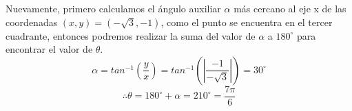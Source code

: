 \vspace{4mm}
Nuevamente, primero calculamos el ángulo auxiliar ${\alpha}$ más cercano al eje x de las coordenadas ${(x,y) = (-\sqrt{3},-1)}$, como el punto se encuentra en el tercer cuadrante, entonces podremos realizar la suma del valor de ${\alpha}$ a ${180^{\circ}}$ para encontrar el valor de ${\theta}$.
\[\alpha = tan^{-1}\left(\frac{y}{x}\right) = tan^{-1}\left( \left|\frac{-1}{-\sqrt{3}}\right| \right) = 30^{\circ}\]
\[\therefore \theta = 180^{\circ} + \alpha = 210^{\circ} = \frac{7\pi}{6}\]

\cite{lehmann}

